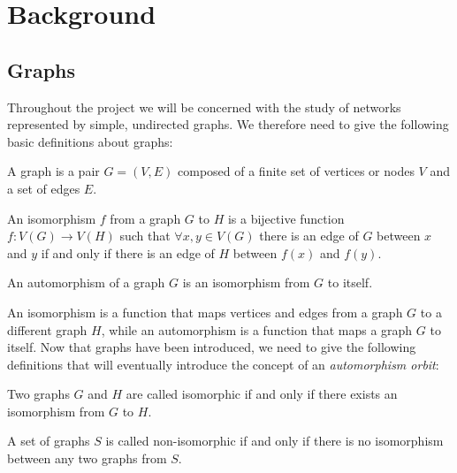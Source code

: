 \chapter{Background}
\label{chp:background}

\section{Graphs}

Throughout the project we will be concerned with the study of networks represented by simple, undirected graphs. We therefore need to give the following basic definitions about graphs:

\begin{mydef}
 A graph is a pair $G = (V,E)$ composed of a finite set of vertices or nodes $V$ and a set of edges $E$.
\end{mydef}

\begin{mydef}
An isomorphism $f$ from a graph $G$ to $H$ is a bijective function $f:V(G) \to V(H)$ such that $\forall x,y \in V(G)$ there is an edge of $G$ between $x$ and $y$ if and only if there is an edge of $H$ between $f(x)$ and $f(y)$.
\end{mydef}

\begin{mydef}
An automorphism of a graph $G$ is an isomorphism from $G$ to itself.
\end{mydef}

An isomorphism is a function that maps vertices and edges from a graph $G$ to a different graph $H$, while an automorphism is a function that maps a graph $G$ to itself. Now that graphs have been introduced, we need to give the following definitions that will eventually introduce the concept of an \emph{automorphism orbit}:

\begin{mydef}
Two graphs $G$ and $H$ are called isomorphic if and only if there exists an isomorphism from $G$ to $H$.
\end{mydef}

\begin{mydef}
\label{def:non_iso}
A set of graphs $S$ is called non-isomorphic if and only if there is no isomorphism between any two graphs from $S$.
\end{mydef}

